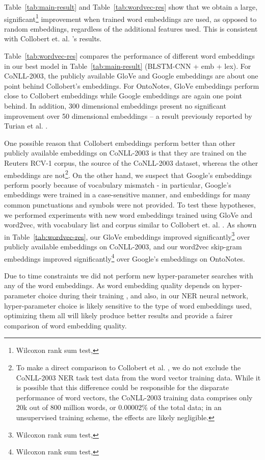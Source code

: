 \documentclass[11pt,letterpaper]{article}
\begin{document}
Table~\ref{tab:main-result} and Table~\ref{tab:wordvec-res} show that we obtain a large, significant\footnote{Wilcoxon rank sum test, } improvement when trained word embeddings are used, as opposed to random embeddings, regardless of the additional features used. This is consistent with  Collobert et. al. 's results.

Table~\ref{tab:wordvec-res} compares the performance of different word embeddings in our best model in Table~\ref{tab:main-result} (BLSTM-CNN + emb + lex). For CoNLL-2003, the publicly available GloVe and Google embeddings are about one point behind Collobert's embeddings. For OntoNotes, GloVe embeddings perform close to Collobert embeddings while Google embeddings are again one point behind. In addition, 300 dimensional embeddings present no significant improvement over 50 dimensional embeddings \--- a result previously reported by Turian et al. .

One possible reason that Collobert embeddings perform better than other publicly available embeddings on CoNLL-2003 is that they are trained on the Reuters RCV-1 corpus, the source of the CoNLL-2003 dataset, whereas the other embeddings are not\footnote{To make a direct comparison to Collobert et al. , we do not exclude the CoNLL-2003 NER task test data from the word vector training data. While it is possible that this difference could be responsible for the disparate performance of word vectors, the CoNLL-2003 training data comprises only 20k out of 800 million words, or 0.00002\% of the total data; in an unsupervised training scheme, the effects are likely negligible.}. On the other hand, we suspect that Google's embeddings perform poorly because of vocabulary mismatch \-- in particular, Google's embeddings were trained in a case-sensitive manner, and embeddings for many common punctuations and symbols were not provided. To test these hypotheses, we performed experiments with new word embeddings trained using GloVe and word2vec, with vocabulary list and corpus similar to Collobert et. al. . As shown in Table~\ref{tab:wordvec-res}, our GloVe embeddings improved significantly\footnote{Wilcoxon rank sum test, } over publicly available embeddings on CoNLL-2003, and our word2vec skip-gram  embeddings improved significantly\footnote{Wilcoxon rank sum test, } over Google's embeddings on OntoNotes. 



Due to time constraints we did not perform new hyper-parameter searches with any of the word embeddings. As word embedding quality depends on hyper-parameter choice during their training \cite{pennington2014}, and also, in our NER neural network, hyper-parameter choice is likely sensitive to the type of word embeddings used, optimizing them all will likely produce better results and provide a fairer comparison of word embedding quality.
\end{document}
